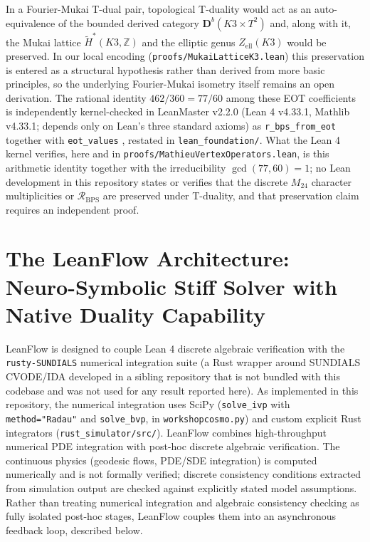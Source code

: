 \documentclass[11pt,a4paper]{article}
\begin{document}
In a Fourier-Mukai T-dual pair, topological T-duality would act as an auto-equivalence of the bounded derived category $\mathbf{D}^b(K3 \times T^2)$ and, along with it, the Mukai lattice $\widetilde{H}^*(K3, \mathbb{Z})$ and the elliptic genus $Z_{\text{ell}}(K3)$ would be preserved. In our local encoding (\texttt{proofs/MukaiLatticeK3.lean}) this preservation is entered as a structural hypothesis rather than derived from more basic principles, so the underlying Fourier-Mukai isometry itself remains an open derivation. The rational identity $462/360 = 77/60$ among these EOT coefficients is independently kernel-checked in LeanMaster v2.2.0 (Lean 4 v4.33.1, Mathlib v4.33.1; depends only on Lean's three standard axioms) as \texttt{r\_bps\_from\_eot} together with \texttt{eot\_values} \cite{leanmaster2026}, restated in \texttt{lean\_foundation/}. What the Lean 4 kernel verifies, here and in \texttt{proofs/MathieuVertexOperators.lean}, is this arithmetic identity together with the irreducibility $\gcd(77,60)=1$; no Lean development in this repository states or verifies that the discrete $M_{24}$ character multiplicities or $\mathcal{R}_{\text{BPS}}$ are preserved under T-duality, and that preservation claim requires an independent proof.
\section{The LeanFlow Architecture: Neuro-Symbolic Stiff Solver with Native Duality Capability}
\label{sec:leanflow}

LeanFlow is designed to couple Lean 4 discrete algebraic verification with the \texttt{rusty-SUNDIALS} numerical integration suite (a Rust wrapper around SUNDIALS CVODE/IDA developed in a sibling repository that is not bundled with this codebase and was not used for any result reported here). As implemented in this repository, the numerical integration uses SciPy (\texttt{solve\_ivp} with \texttt{method="Radau"} and \texttt{solve\_bvp}, in \texttt{workshopcosmo.py}) and custom explicit Rust integrators (\texttt{rust\_simulator/src/}). LeanFlow combines high-throughput numerical PDE integration with post-hoc discrete algebraic verification. The continuous physics (geodesic flows, PDE/SDE integration) is computed numerically and is not formally verified; discrete consistency conditions extracted from simulation output are checked against explicitly stated model assumptions. Rather than treating numerical integration and algebraic consistency checking as fully isolated post-hoc stages, LeanFlow couples them into an asynchronous feedback loop, described below.
\end{document}
